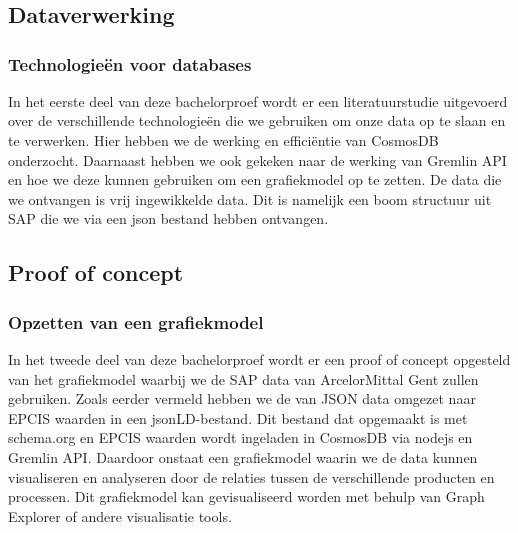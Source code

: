 
\chapter{}%
\label{ch:methodologie}
\section{Dataverwerking}
\subsection{Technologieën voor databases}
In het eerste deel van deze bachelorproef wordt er een literatuurstudie uitgevoerd over de verschillende technologieën die we gebruiken om onze data op te slaan en te verwerken.
Hier hebben we de werking en efficiëntie van CosmosDB onderzocht. Daarnaast hebben we ook gekeken naar de werking van Gremlin API en hoe we deze kunnen gebruiken om een grafiekmodel op te zetten.
De data die we ontvangen is vrij ingewikkelde data. Dit is namelijk een boom structuur uit SAP die we via een json bestand hebben ontvangen.


\section{Proof of concept}
\subsection{Opzetten van een grafiekmodel}
In het tweede deel van deze bachelorproef wordt er een proof of concept opgesteld van het grafiekmodel waarbij we de SAP data van ArcelorMittal Gent zullen gebruiken.
Zoals eerder vermeld hebben we de van JSON data omgezet naar EPCIS waarden in een jsonLD-bestand. Dit bestand dat opgemaakt is met schema.org en EPCIS waarden wordt ingeladen in CosmosDB via nodejs en Gremlin API.\@
Daardoor onstaat een grafiekmodel waarin we de data kunnen visualiseren en analyseren door de relaties tussen de verschillende producten en processen.
Dit grafiekmodel kan gevisualiseerd worden met behulp van Graph Explorer of andere visualisatie tools.

